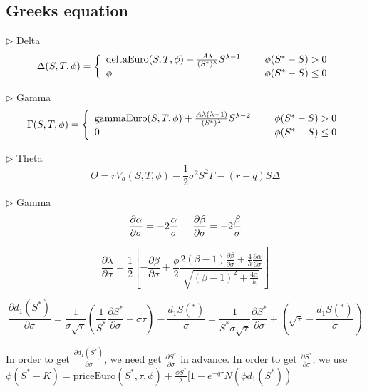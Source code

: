 \documentclass[preprint,12pt,1p]{elsarticle}
\begin{document}
\subsection{Greeks equation}
$\rhd$ Delta\\
\[   \Delta(S, T, \phi) = \left\{ 
\begin{array}{ll}
      \text{deltaEuro}(S, T, \phi) + \frac{A\lambda}{(S^*)^{\lambda}} S^{\lambda-1} & \hspace{0.5cm}  \phi(S^* - S) > 0\\
      \phi & \hspace{0.5cm}  \phi(S^* - S) \leq 0\\
\end{array} 
\right. \]

$\rhd$ Gamma\\
\[   \Gamma(S, T, \phi) = \left\{ 
\begin{array}{ll}
      \text{gammaEuro}(S, T, \phi) + \frac{A\lambda (\lambda-1)}{(S^*)^{\lambda}} S^{\lambda-2} & \hspace{0.5cm}  \phi(S^* - S) > 0\\
      0 & \hspace{0.5cm}  \phi(S^* - S) \leq 0\\
\end{array} 
\right. \]

$\rhd$ Theta\\
$$\Theta = rV_a(S, T, \phi)  - \frac{1}{2}\sigma^2 S^2 \Gamma - (r-q)S\Delta$$

$\rhd$ Gamma\\
$$\frac{\partial \alpha}{\partial \sigma} = -2 \frac{\alpha}{\sigma} \hspace{0.5cm} \frac{\partial \beta}{\partial \sigma} = -2 \frac{\beta}{\sigma}$$

$$\frac{\partial \lambda}{\partial \sigma} = \frac{1}{2}\left[- \frac{\partial \beta}{\partial \sigma} +\frac{\phi}{2} \frac{2(\beta-1) \frac{\partial \beta}{\partial \sigma} + \frac{4}{h} \frac{\partial \alpha}{\partial \sigma} }{\sqrt{(\beta-1)^2 + \frac{4 \alpha}{h}}}\right]$$

$$\frac{\partial d_1(S^*)}{\partial \sigma} = \frac{1}{\sigma \sqrt{\tau}} (\frac{1}{S^*} \frac{\partial S^*}{\partial \sigma} +\sigma \tau) - \frac{d_1S(^*)}{\sigma}=\frac{1}{S^*\sigma \sqrt{\tau}}\frac{\partial S^*}{\partial \sigma} + (\sqrt{\tau} - \frac{d_1S(^*)}{\sigma})$$

In order to get $\frac{\partial d_1(S^*)}{\partial \sigma} $, we need get $\frac{\partial S^*}{\partial \sigma}$ in advance. In order to get $\frac{\partial S^*}{\partial \sigma}$, we use $ \phi  (S^* - K) = \text{priceEuro}(S^*, \tau, \phi)  + \frac{\phi S^*}{\lambda}[1 - e^{-q\tau} N(\phi d_1(S^*))$\\[6pt]
\end{document}
